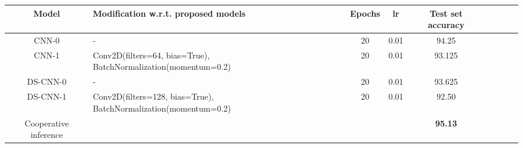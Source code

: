 \documentclass{article}
\begin{document}
\vspace{0.2cm}

\begin{center}
\begin{tabular}{ |c|p{6cm}|c|c|c|c|c|c	|c| } 
\hline
\vspace{-0.09cm}

\textbf{Model} &\textbf{Modification w.r.t. proposed models} &\textbf{Epochs}&\textbf{lr} &\textbf{Test set accuracy}\\
\hline
CNN-0 &-& 20 & 0.01 & 94.25\\
CNN-1&Conv2D(filters=64, bias=True), BatchNormalization(momentum=0.2)&20&0.01&93.125\\
DS-CNN-0&-&20&0.01&93.625\\ 
DS-CNN-1&Conv2D(filters=128, bias=True), BatchNormalization(momentum=0.2)&20&0.01&92.50\\
Cooperative inference &&&&\textbf{95.13} \\
\hline

\end{tabular}

\end{center}
\end{document}

